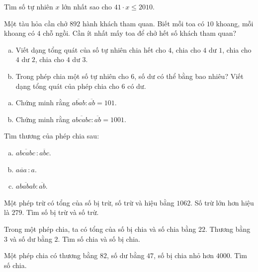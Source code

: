 \begin{bt}
\end{bt}   \begin{bt}
Tìm số tự nhiên $x$ lớn nhất sao cho $41\cdot x \le 2010$. 
\end{bt}   \begin{bt}
Một tàu hỏa cần chở $892$ hành khách tham quan. Biết mỗi toa có $10$ khoang, mỗi khoang có $4$ chỗ ngồi. Cần ít nhất mấy toa để chở hết số khách tham quan?
\end{bt}   \begin{bt}\qquad
\begin{enumerate}[a)]
\item Viết dạng tổng quát của số tự nhiên chia hết cho $4$, chia cho $4$ dư $1$, chia cho $4$ dư $2$, chia cho $4$ dư $3$.
\item Trong phép chia một số tự nhiên cho $6$, số dư có thể bằng bao nhiêu? Viết dạng tổng quát của phép chia cho $6$ có dư.
\end{enumerate}
\end{bt}   \begin{bt}\qquad
\begin{enumerate}[a)]
\item Chứng minh rằng $\overline{abab}:\overline{ab}=101$.
\item Chứng minh rằng $\overline{abcabc}:\overline{ab}=1001$.
\end{enumerate}
\end{bt}   \begin{bt}
Tìm thương của phép chia sau:
\begin{enumerate}[a)]
\item $\overline{abcabc\,}:\overline{abc}$.
\item $\overline{aaa\,} : a$.
\item $\overline{ababab}:\overline{ab}$.
\end{enumerate}
\end{bt}   \begin{bt}
Một phép trừ có tổng của số bị trừ, số trừ và hiệu bằng $1062$. Số trừ lớn hơn hiệu là $279$. Tìm số bị trừ và số trừ.
\end{bt}   \begin{bt}
Trong một phép chia, ta có tổng của số bị chia và số chia bằng $22$. Thương bằng $3$ và số dư bằng $2$. Tìm số chia và số bị chia.
\end{bt}   \begin{bt}
Một phép chia có thương bằng $82$, số dư bằng $47$, số bị chia nhỏ hơn $4000$. Tìm số chia.

\end{bt} 